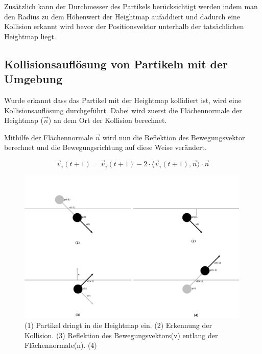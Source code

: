 \begin{Spacing}{\mylinespace}
    	Zusätzlich kann der Durchmesser des Partikels berücksichtigt werden
    	indem man den Radius zu dem Höhenwert der Heightmap aufaddiert und
    	dadurch eine Kollision erkannt wird bevor der Positionsvektor unterhalb
    	der tatsächlichen Heightmap liegt.

    \subsection{Kollisionsauflösung von Partikeln mit der Umgebung}
    	Wurde erkannt dass das Partikel mit der Heightmap kollidiert ist, wird eine
    	Kollisionsauflösung durchgeführt. Dabei wird zuerst die Flächennormale
    	der Heightmap ($\vec{n}$) an dem Ort der Kollision berechnet.


    	Mithilfe der Flächennormale $\vec{n}$ wird nun die Reflektion des Bewegungsvektor
    	berechnet und die Bewegungsrichtung auf diese Weise verändert.

    	\[ \vec{v}_{i}(t+1) = \vec{v}_{i}(t+1) -2 \cdot \langle \vec{v}_{i}(t+1) , \vec{n} \rangle \cdot \vec{n} \]

		\begin{figure}[h!]
			\includegraphics[width=0.99\textwidth]{graphics/Phys_kh1234.png}
			\caption{(1) Partikel dringt in die Heightmap ein. (2) Erkennung der Kollision. (3) Reflektion des Bewegungsvektors(v) entlang der Flächennormale(n). (4) }
			\label{fig:reflexHeihtmap}
		\end{figure}


\end{Spacing}
